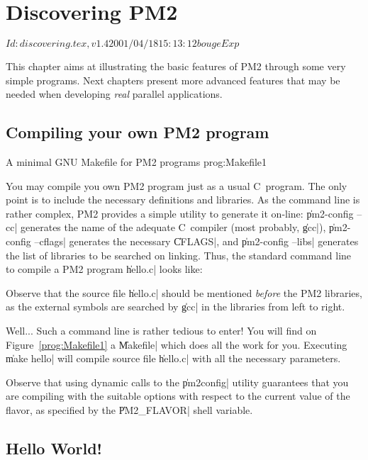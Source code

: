 \chapter{Discovering PM2}

\stamp $Id: discovering.tex,v 1.4 2001/04/18 15:13:12 bouge Exp $

This chapter aims at illustrating the basic features of PM2 through
some very simple programs. Next chapters present more advanced
features that may be needed when developing \emph{real} parallel
applications.

\section{Compiling your own PM2 program}

 {A minimal GNU Makefile for PM2
  programs} {prog:Makefile1}

You may compile you own PM2 program just as a usual C~program. The
only point is to include the necessary definitions and libraries.  As
the command line is rather complex, PM2 provides a simple utility to
generate it on-line: \|pm2-config --cc| generates the name of the
adequate C~compiler (most probably, \|gcc|), \|pm2-config --cflags|
generates the necessary \|CFLAGS|, and \|pm2-config --libs| generates
the list of libraries to be searched on linking. Thus, the standard
command line to compile a PM2 program \|hello.c| looks like:
Observe that the source file \|hello.c| should be mentioned
\emph{before} the PM2 libraries, as the external symbols are searched by
\|gcc| in the libraries from left to right.

Well... Such a command line is rather tedious to enter! You will find
on Figure~\ref{prog:Makefile1} a \|Makefile| which does all the work
for you. Executing \|make hello| will compile source file \|hello.c|
with all the necessary parameters.

Observe that using dynamic calls to the \|pm2config| utility guarantees
that you are compiling with the suitable options with respect to the
current value of the flavor, as specified by the \|PM2_FLAVOR|
shell variable.

\section{Hello World!}

